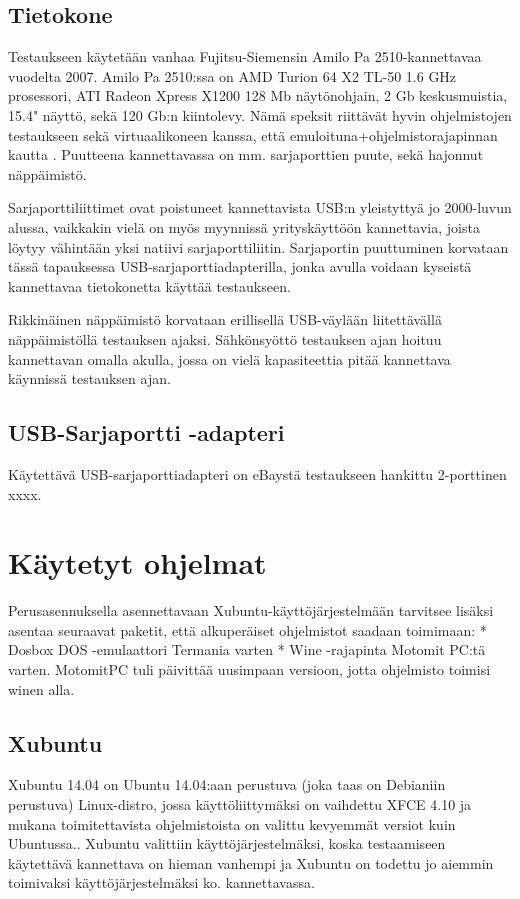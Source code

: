 \documentclass[11pt,a4paper,oneside,article]{memoir}
\begin{document}
\subsection{Tietokone}
Testaukseen käytetään vanhaa Fujitsu-Siemensin Amilo Pa 2510-kannettavaa vuodelta 2007. Amilo Pa 2510:ssa on AMD Turion 64 X2 TL-50 1.6 GHz prosessori, ATI Radeon Xpress X1200 128 Mb näytönohjain, 2 Gb keskusmuistia, 15.4" näyttö, sekä 120 Gb:n kiintolevy. Nämä speksit riittävät hyvin ohjelmistojen testaukseen sekä virtuaalikoneen kanssa, että emuloituna+ohjelmistorajapinnan kautta \cite{fs_amilo:review}. Puutteena kannettavassa on mm. sarjaporttien puute, sekä hajonnut näppäimistö. 

Sarjaporttiliittimet ovat poistuneet kannettavista USB:n yleistyttyä jo 2000-luvun alussa, vaikkakin vielä on myös myynnissä yrityskäyttöön kannettavia, joista löytyy vähintään yksi natiivi sarjaporttiliitin\cite{hp:laptop}. Sarjaportin puuttuminen korvataan tässä tapauksessa USB-sarjaporttiadapterilla, jonka avulla voidaan kyseistä kannettavaa tietokonetta käyttää testaukseen.

Rikkinäinen näppäimistö korvataan erillisellä USB-väylään liitettävällä näppäimistöllä testauksen ajaksi. Sähkönsyöttö testauksen ajan hoituu kannettavan omalla akulla, jossa on vielä kapasiteettia pitää kannettava käynnissä testauksen ajan.

\subsection{USB-Sarjaportti -adapteri}
Käytettävä USB-sarjaporttiadapteri on eBaystä testaukseen hankittu 2-porttinen xxxx. 


\section{Käytetyt ohjelmat}

Perusasennuksella asennettavaan Xubuntu-käyttöjärjestelmään tarvitsee
lisäksi asentaa seuraavat paketit, että alkuperäiset ohjelmistot saadaan
toimimaan: * Dosbox DOS -emulaattori Termania varten * Wine -rajapinta
Motomit PC:tä varten. MotomitPC tuli päivittää uusimpaan versioon, jotta
ohjelmisto toimisi winen alla.

\subsection{Xubuntu}

Xubuntu 14.04 on Ubuntu 14.04:aan perustuva (joka taas on Debianiin perustuva) Linux-distro, jossa 
käyttöliittymäksi on vaihdettu XFCE 4.10 ja mukana toimitettavista ohjelmistoista on valittu kevyemmät 
versiot kuin Ubuntussa.\cite{xubuntu:about}. Xubuntu valittiin käyttöjärjestelmäksi, koska testaamiseen 
käytettävä kannettava on hieman vanhempi ja Xubuntu on todettu jo aiemmin toimivaksi käyttöjärjestelmäksi ko. kannettavassa.
\end{document}
